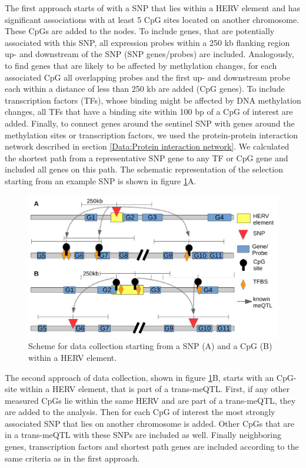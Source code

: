 \documentclass[a4paper,12pt,twoside,openright]{article}
\begin{document}
The first approach starts of with a SNP that lies within a HERV element and has significant associations with at least 5 CpG sites located on another chromosome. These CpGs are added to the nodes. To include genes, that are potentially associated with this SNP, all expression probes within a 250 kb flanking region up- and downstream of the SNP (SNP genes/probes) are included. Analogously, to find genes that are likely to be affected by methylation changes, for each associated CpG all overlapping probes and the first up- and downstream probe each within a distance of less than 250 kb are added (CpG genes). To include transcription factors (TFs), whose binding might be affected by DNA methylation changes, all TFs that have a binding site within 100 bp of a CpG of interest are added. Finally, to connect genes around the sentinel SNP with genes around the methylation sites or transcription factors, we used the protein-protein interaction network described in section \ref{Data:Protein interaction network}. We calculated the shortest path from a representative SNP gene to any TF or CpG gene and included all genes on this path. The schematic representation of the selection starting from an example SNP is shown in figure \ref{fig:ggm.data.collect.scheme}A.

\begin{figure}[b!]
	\includegraphics[scale=0.75, keepaspectratio = true]{../figures/ggm_data_collect_scheme}
	\caption{Scheme for data collection starting from a SNP (A) and a CpG (B) within a HERV element. }
	\label{fig:ggm.data.collect.scheme}
\end{figure}



The second approach of data collection, shown in figure \ref{fig:ggm.data.collect.scheme}B, starts with an CpG-site within a HERV element, that is part of a trans-meQTL. First, if any other measured CpGs lie within the same HERV and are part of a trans-meQTL, they are added to the analysis. Then for each CpG of interest the most strongly associated SNP that lies on another chromosome is added. Other CpGs that are in a trans-meQTL with these SNPs are included as well. Finally neighboring genes, transcription factors and shortest path genes are included according to the same criteria as in the first approach.
\end{document}
